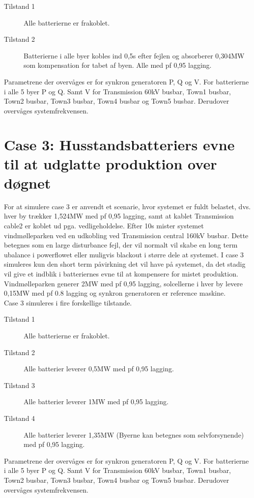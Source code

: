 \begin{description}
	\item[Tilstand 1] Alle batterierne er frakoblet.
	\item[Tilstand 2] Batterierne i alle byer kobles ind 0,5s efter fejlen og absorberer 0,304MW som kompensation for tabet af byen. Alle med pf 0,95 lagging.
\end{description}

Parametrene der overvåges er for synkron generatoren P, Q og V.
For batterierne i alle 5 byer P og Q. Samt V for Transmission 60kV busbar, Town1 busbar, Town2 busbar, Town3 busbar, Town4 busbar og Town5 busbar.
Derudover overvåges systemfrekvensen.

\section{Case 3: Husstandsbatteriers evne til at udglatte produktion over døgnet}
For at simulere case 3 er anvendt et scenarie, hvor systemet er fuldt belastet, dvs. hver by trækker 1,524MW med pf 0,95 lagging, samt at kablet Transmission cable2 er koblet ud pga. vedligeholdelse. Efter 10s mister systemet vindmølleparken ved en udkobling ved Transmission central 160kV busbar. Dette betegnes som en large disturbance fejl, der vil normalt vil skabe en long term ubalance i powerflowet eller muligvis blackout i større dele at systemet. I case 3 simuleres kun den short term påvirkning det vil have på systemet, da det stadig vil give et indblik i batteriernes evne til at kompensere for mistet produktion.\\
Vindmølleparken generer 2MW med pf 0,95 lagging, solcellerne i hver by levere 0,15MW med pf 0.8 lagging og synkron generatoren er reference maskine.\\
Case 3 simuleres i fire forskellige tilstande.

\begin{description}
	\item[Tilstand 1] Alle batterierne er frakoblet.
	\item[Tilstand 2] Alle batterier leverer 0,5MW med pf 0,95 lagging.
	\item[Tilstand 3] Alle batterier leverer 1MW med pf 0,95 lagging.
	\item[Tilstand 4] Alle batterier leverer 1,35MW (Byerne kan betegnes som selvforsynende) med pf 0,95 lagging.
\end{description}

Parametrene der overvåges er for synkron generatoren P, Q og V.
For batterierne i alle 5 byer P og Q. Samt V for Transmission 60kV busbar, Town1 busbar, Town2 busbar, Town3 busbar, Town4 busbar og Town5 busbar.
Derudover overvåges systemfrekvensen.


